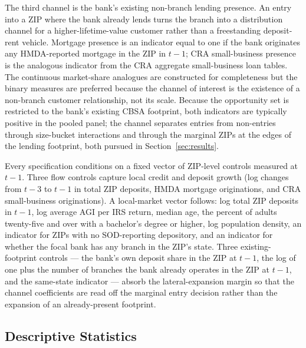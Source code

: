 The third channel is the bank's existing non-branch lending presence. An entry into a ZIP where the bank already lends turns the branch into a distribution channel for a higher-lifetime-value customer rather than a freestanding deposit-rent vehicle. Mortgage presence is an indicator equal to one if the bank originates any HMDA-reported mortgage in the ZIP in $t-1$; CRA small-business presence is the analogous indicator from the CRA aggregate small-business loan tables. The continuous market-share analogues are constructed for completeness but the binary measures are preferred because the channel of interest is the existence of a non-branch customer relationship, not its scale. Because the opportunity set is restricted to the bank's existing CBSA footprint, both indicators are typically positive in the pooled panel; the channel separates entries from non-entries through size-bucket interactions and through the marginal ZIPs at the edges of the lending footprint, both pursued in Section~\ref{sec:results}.

Every specification conditions on a fixed vector of ZIP-level controls measured at $t-1$. Three flow controls capture local credit and deposit growth (log changes from $t-3$ to $t-1$ in total ZIP deposits, HMDA mortgage originations, and CRA small-business originations). A local-market vector follows: log total ZIP deposits in $t-1$, log average AGI per IRS return, median age, the percent of adults twenty-five and over with a bachelor's degree or higher, log population density, an indicator for ZIPs with no SOD-reporting depository, and an indicator for whether the focal bank has any branch in the ZIP's state. Three existing-footprint controls --- the bank's own deposit share in the ZIP at $t-1$, the log of one plus the number of branches the bank already operates in the ZIP at $t-1$, and the same-state indicator --- absorb the lateral-expansion margin so that the channel coefficients are read off the marginal entry decision rather than the expansion of an already-present footprint.

\subsection{Descriptive Statistics}
\label{sec:data:desc}

